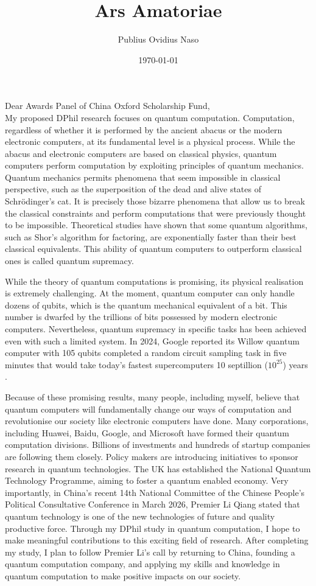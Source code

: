 \documentclass{article}
\title{Ars Amatoriae}
\author{Publius Ovidius Naso}
\date{\today}
\theoremstyle{definition}
\theoremstyle{definition}
\theoremstyle{remark}
\begin{document}

Dear Awards Panel of China Oxford Scholarship Fund,
\\

My proposed DPhil research focuses on quantum computation. 
Computation, regardless of whether it is performed by the ancient abacus or the modern electronic computers, at its fundamental level is a physical process. 
While the abacus and electronic computers are based on classical physics, quantum computers perform computation by exploiting principles of quantum mechanics. 
Quantum mechanics permits phenomena that seem impossible in classical perspective, such as the superposition of the dead and alive states of Schrödinger’s cat. 
It is precisely those bizarre phenomena that allow us to break the classical constraints and perform computations that were previously thought to be impossible. 
Theoretical studies have shown that some quantum algorithms, such as Shor’s algorithm for factoring, are exponentially faster than their best classical equivalents. 
This ability of quantum computers to outperform classical ones is called quantum supremacy.

While the theory of quantum computations is promising, its physical realisation is extremely challenging.
At the moment, quantum computer can only handle dozens of qubits, which is the quantum mechanical equivalent of a bit. 
This number is dwarfed by the trillions of bits possessed by modern electronic computers. 
Nevertheless, quantum supremacy in specific tasks has been achieved even with such a limited system.
In 2024, Google reported its Willow quantum computer with 105 qubits completed a random circuit sampling task in five minutes that would take today's fastest supercomputers 10 septillion ($10^25$) years \cite{google}. 


Because of these promising results, many people, including myself, believe that quantum computers will fundamentally change our ways of computation and revolutionise our society like electronic computers have done. 
Many corporations, including Huawei, Baidu, Google, and Microsoft have formed their quantum computation divisions. 
Billions of investments and hundreds of startup companies are following them closely. 
Policy makers are introducing initiatives to sponsor research in quantum technologies. 
The UK has established the National Quantum Technology Programme, aiming to foster a quantum enabled economy. 
Very importantly, in China’s recent 14th National Committee of the Chinese People's Political Consultative Conference in March 2026, Premier Li Qiang stated that quantum technology is one of the new technologies of future and quality productive force. 
Through my DPhil study in quantum computation, I hope to make meaningful contributions to this exciting field of research. 
After completing my study, I plan to follow Premier Li’s call by returning to China, founding a quantum computation company, and applying my skills and knowledge in quantum computation to make positive impacts on our society. 
\end{document}
